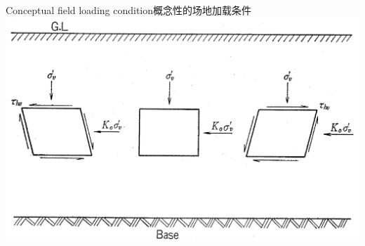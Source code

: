 {{\begin{BiliFigure}[float=H,label=figure:combination-of-side-by-side-and-end-by-end-charts-example-3]{Conceptual field loading condition}{概念性的场地加载条件}
            \includegraphics[width=\linewidth]{figures/figure-6.png}
        \end{BiliFigure}
    }
}

